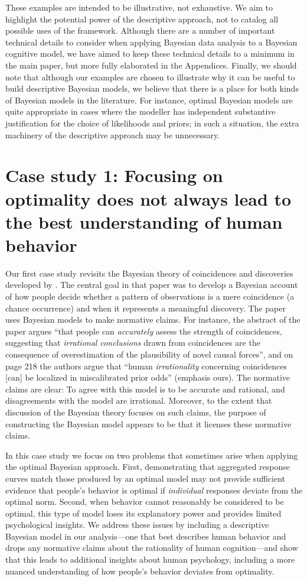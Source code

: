 \documentclass[doc,floatsintext]{apa6}
\begin{document}
These examples are intended to be illustrative, not exhaustive. We aim to highlight the potential power of the descriptive approach, not to catalog all possible uses of the framework. Although there are a number of important technical details to consider when applying Bayesian data analysis to a Bayesian cognitive model, we have aimed to keep these technical details to a minimum in the main paper, but more fully elaborated in the Appendices. Finally, we should note that although our examples are chosen to illustrate why it can be useful to build descriptive Bayesian models, we believe that there is a place for both kinds of Bayesian models in the literature. For instance, optimal Bayesian models are quite appropriate in cases where the modeller has independent substantive justification for the choice of likelihoods and priors; in such a situation, the extra machinery of the descriptive approach may be unnecessary.


\section{Case study 1: Focusing on optimality does not always lead to the best understanding of human behavior}

Our first case study revisits the Bayesian theory of coincidences and discoveries developed by . The central goal in that paper was to develop a Bayesian account of how people decide whether a pattern of observations is a mere coincidence (a chance occurrence) and when it represents a meaningful discovery. The paper uses Bayesian models to make normative claims. For instance, the abstract of the paper argues ``that people can {\it accurately} assess the strength of coincidences, suggesting that {\it irrational conclusions} drawn from coincidences are the consequence of overestimation of the plausibility of novel causal forces'', and on page 218 the authors argue that  ``human {\it irrationality} concerning coincidences [can] be localized in miscalibrated prior odds'' (emphasis ours). The normative claims are clear: To agree with this model is to be accurate and rational, and disagreements with the model are irrational. Moreover, to the extent that discussion of the Bayesian theory focuses on such claims, the purpose of constructing the Bayesian model appears to be that it licenses these normative claims.

In this case study we focus on two problems that sometimes arise when applying the optimal Bayesian approach. First, demonstrating that aggregated response curves match those produced by an optimal model may not provide sufficient evidence that people's behavior is optimal if {\it individual} responses deviate from the optimal norm. Second, when behavior cannot reasonably be considered to be optimal, this type of model loses its explanatory power and provides limited psychological insights. We address these issues by including a descriptive Bayesian model in our analysis---one that best describes human behavior and drops any normative claims about the rationality of human cognition---and show that this leads to additional insights about human psychology, including a more nuanced understanding of how people's behavior deviates from optimality.
\end{document}
